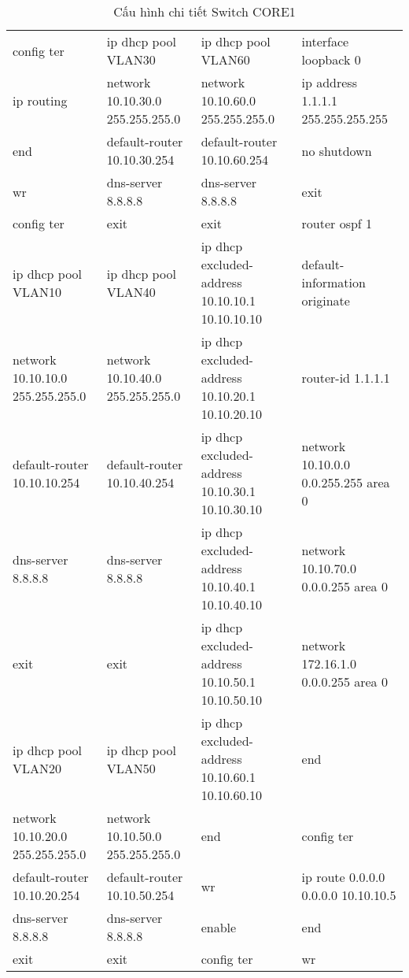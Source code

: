 \begin{table}[H]
\centering
\begin{tabular}{|p{4cm}|p{4cm}|p{4cm}|p{4cm}|}
\hline

config ter&	ip dhcp pool VLAN30	&ip dhcp pool VLAN60	&interface loopback 0\\
ip routing	&network 10.10.30.0 255.255.255.0	&network 10.10.60.0 255.255.255.0	&ip address 1.1.1.1 255.255.255.255\\
end&	default-router 10.10.30.254	&default-router 10.10.60.254	&no shutdown\\
wr	&dns-server 8.8.8.8	&dns-server 8.8.8.8	&exit\\
config ter	&exit	&exit&	router ospf 1\\
ip dhcp pool VLAN10&	ip dhcp pool VLAN40	&ip dhcp excluded-address 10.10.10.1 10.10.10.10&	default-information originate\\
network 10.10.10.0 255.255.255.0&	network 10.10.40.0 255.255.255.0&	ip dhcp excluded-address 10.10.20.1 10.10.20.10&	router-id 1.1.1.1\\
default-router 10.10.10.254&	default-router 10.10.40.254	&ip dhcp excluded-address 10.10.30.1 10.10.30.10	&network 10.10.0.0 0.0.255.255 area 0\\
dns-server 8.8.8.8	&dns-server 8.8.8.8&	ip dhcp excluded-address 10.10.40.1 10.10.40.10&	network 10.10.70.0 0.0.0.255 area 0\\
exit&	exit&	ip dhcp excluded-address 10.10.50.1 10.10.50.10	&network 172.16.1.0 0.0.0.255 area 0\\
ip dhcp pool VLAN20	&ip dhcp pool VLAN50	&ip dhcp excluded-address 10.10.60.1 10.10.60.10&	end\\
network 10.10.20.0 255.255.255.0&	network 10.10.50.0 255.255.255.0	&end	&config ter\\
default-router 10.10.20.254&	default-router 10.10.50.254	&wr	&ip route 0.0.0.0 0.0.0.0 10.10.10.5\\
dns-server 8.8.8.8&	dns-server 8.8.8.8	&enable	&end\\
exit&	exit	&config ter&	wr\\
\hline
\end{tabular}
\caption{Cấu hình chi tiết Switch CORE1}
\end{table}

